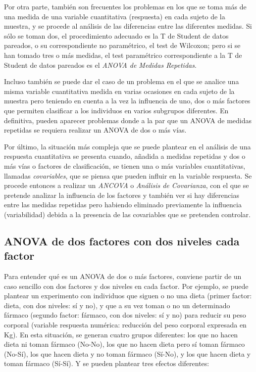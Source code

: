 \documentclass[
  spanish,
  a4paper,
]{scrreport}
\theoremstyle{plain}
\theoremstyle{definition}
\theoremstyle{definition}
\theoremstyle{remark}
\begin{document}
Por otra parte, también son frecuentes los problemas en los que se toma
más de una medida de una variable cuantitativa (respuesta) en cada
sujeto de la muestra, y se procede al análisis de las diferencias entre
las diferentes medidas. Si sólo se toman dos, el procedimiento adecuado
es la T de Student de datos pareados, o su correspondiente no
paramétrico, el test de Wilcoxon; pero si se han tomado tres o más
medidas, el test paramétrico correspondiente a la T de Student de datos
pareados es el \emph{ANOVA de Medidas Repetidas}.

Incluso también se puede dar el caso de un problema en el que se analice
una misma variable cuantitativa medida en varias ocasiones en cada
sujeto de la muestra pero teniendo en cuenta a la vez la influencia de
uno, dos o más factores que permiten clasificar a los individuos en
varios subgrupos diferentes. En definitiva, pueden aparecer problemas
donde a la par que un ANOVA de medidas repetidas se requiera realizar un
ANOVA de dos o más vías.

Por último, la situación más compleja que se puede plantear en el
análisis de una respuesta cuantitativa se presenta cuando, añadida a
medidas repetidas y dos o más vías o factores de clasificación, se
tienen una o más variables cuantitativas, llamadas \emph{covariables},
que se piensa que pueden influir en la variable respuesta. Se procede
entonces a realizar un \emph{ANCOVA} o \emph{Análisis de Covarianza},
con el que se pretende analizar la influencia de los factores y también
ver si hay diferencias entre las medidas repetidas pero habiendo
eliminado previamente la influencia (variabilidad) debida a la presencia
de las covariables que se pretenden controlar.

\subsection{ANOVA de dos factores con dos niveles cada
factor}\label{anova-de-dos-factores-con-dos-niveles-cada-factor}

Para entender qué es un ANOVA de dos o más factores, conviene partir de
un caso sencillo con dos factores y dos niveles en cada factor. Por
ejemplo, se puede plantear un experimento con individuos que siguen o no
una dieta (primer factor: dieta, con dos niveles: sí y no), y que a su
vez toman o no un determinado fármaco (segundo factor: fármaco, con dos
niveles: sí y no) para reducir su peso corporal (variable respuesta
numérica: reducción del peso corporal expresada en Kg). En esta
situación, se generan cuatro grupos diferentes: los que no hacen dieta
ni toman fármaco (No-No), los que no hacen dieta pero sí toman fármaco
(No-Sí), los que hacen dieta y no toman fármaco (Sí-No), y los que hacen
dieta y toman fármaco (Sí-Sí). Y se pueden plantear tres efectos
diferentes:
\end{document}
